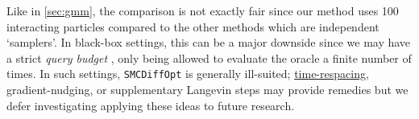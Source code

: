 Like in \autoref{sec:gmm}, the comparison is not exactly fair since our method uses 100
interacting particles compared to the other methods which are independent `samplers'. In black-box
settings, this can be a major downside since we may have a strict \emph{query budget}
\parencite{krishnamoorthyDiffusionModelsBlackBox2023}, only being allowed to evaluate the oracle
a finite number of times. In such settings, \texttt{SMCDiffOpt} is generally ill-suited;
\hyperref[rem:time-respacing]{time-respacing}, gradient-nudging, or supplementary Langevin steps may
provide remedies but we defer investigating applying these ideas to future research.
